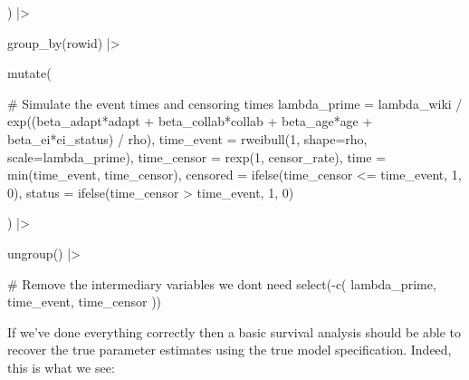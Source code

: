 \documentclass[
  letterpaper,
  DIV=11,
  numbers=noendperiod]{scrreprt}
\newenvironment{Shaded}{\begin{snugshade}}{\end{snugshade}}
\newcommand{\AttributeTok}[1]{\textcolor[rgb]{0.40,0.45,0.13}{#1}}
\newcommand{\CommentTok}[1]{\textcolor[rgb]{0.37,0.37,0.37}{#1}}
\newcommand{\DecValTok}[1]{\textcolor[rgb]{0.68,0.00,0.00}{#1}}
\newcommand{\FunctionTok}[1]{\textcolor[rgb]{0.28,0.35,0.67}{#1}}
\newcommand{\NormalTok}[1]{\textcolor[rgb]{0.00,0.23,0.31}{#1}}
\newcommand{\SpecialCharTok}[1]{\textcolor[rgb]{0.37,0.37,0.37}{#1}}
\begin{document}
\begin{Shaded}
\begin{Highlighting}[]
\NormalTok{  ) }\SpecialCharTok{|\textgreater{}}

  \FunctionTok{group\_by}\NormalTok{(rowid) }\SpecialCharTok{|\textgreater{}}

  \FunctionTok{mutate}\NormalTok{(}

    \CommentTok{\# Simulate the event times and censoring times}
    \AttributeTok{lambda\_prime =}\NormalTok{ lambda\_wiki }\SpecialCharTok{/} \FunctionTok{exp}\NormalTok{((beta\_adapt}\SpecialCharTok{*}\NormalTok{adapt }\SpecialCharTok{+}\NormalTok{ beta\_collab}\SpecialCharTok{*}\NormalTok{collab }\SpecialCharTok{+}\NormalTok{ beta\_age}\SpecialCharTok{*}\NormalTok{age }\SpecialCharTok{+}\NormalTok{ beta\_ei}\SpecialCharTok{*}\NormalTok{ei\_status) }\SpecialCharTok{/}\NormalTok{ rho),}
    \AttributeTok{time\_event =} \FunctionTok{rweibull}\NormalTok{(}\DecValTok{1}\NormalTok{, }\AttributeTok{shape=}\NormalTok{rho, }\AttributeTok{scale=}\NormalTok{lambda\_prime),}
    \AttributeTok{time\_censor =} \FunctionTok{rexp}\NormalTok{(}\DecValTok{1}\NormalTok{, censor\_rate),}
    \AttributeTok{time =} \FunctionTok{min}\NormalTok{(time\_event, time\_censor),}
    \AttributeTok{censored =} \FunctionTok{ifelse}\NormalTok{(time\_censor }\SpecialCharTok{\textless{}=}\NormalTok{ time\_event, }\DecValTok{1}\NormalTok{, }\DecValTok{0}\NormalTok{),}
    \AttributeTok{status =} \FunctionTok{ifelse}\NormalTok{(time\_censor }\SpecialCharTok{\textgreater{}}\NormalTok{ time\_event, }\DecValTok{1}\NormalTok{, }\DecValTok{0}\NormalTok{)}

\NormalTok{  ) }\SpecialCharTok{|\textgreater{}}

  \FunctionTok{ungroup}\NormalTok{() }\SpecialCharTok{|\textgreater{}}

  \CommentTok{\# Remove the intermediary variables we don\textquotesingle{}t need}
  \FunctionTok{select}\NormalTok{(}\SpecialCharTok{{-}}\FunctionTok{c}\NormalTok{(}
\NormalTok{    lambda\_prime,}
\NormalTok{    time\_event,}
\NormalTok{    time\_censor}
\NormalTok{  ))}
\end{Highlighting}
\end{Shaded}

If we've done everything correctly then a basic survival analysis should
be able to recover the true parameter estimates using the true model
specification. Indeed, this is what we see:
\end{document}
